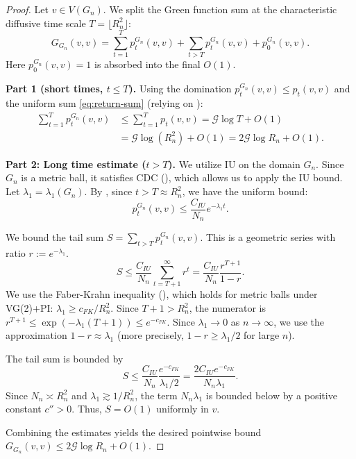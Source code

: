 \documentclass{article}
\numberwithin{equation}{section}
\theoremstyle{definition}
\theoremstyle{remark}
\newcommand{\cG}{\mathcal{G}}
\begin{document}
\begin{proof}
Let $v \in V(G_n)$. We split the Green function sum at the characteristic diffusive time scale $T = \lfloor R_n^2 \rfloor$:
\[
G_{G_n}(v,v) = \sum_{t=1}^{T} p_t^{G_n}(v,v) + \sum_{t > T} p_t^{G_n}(v,v) + p_0^{G_n}(v,v).
\]
Here $p_0^{G_n}(v,v)=1$ is absorbed into the final $O(1)$.

\textbf{Part 1 (short times, $t\le T$).} Using the domination $p_t^{G_n}(v,v)\le p_t(v,v)$ and the uniform sum \eqref{eq:return-sum} (relying on ):
\begin{align*}
\sum_{t=1}^{T} p_t^{G_n}(v,v) &\leq \sum_{t=1}^{T} p_t(v,v) = \cG \log T + O(1) \\
&= \cG \log(R_n^2) + O(1) = 2\cG \log R_n + O(1).
\end{align*}

\textbf{Part 2: Long time estimate ($t > T$).}
We utilize IU on the domain $G_n$. Since $G_n$ is a metric ball, it satisfies CDC (), which allows us to apply the IU bound. Let $\lambda_1 = \lambda_1(G_n)$. By , since $t > T \approx R_n^2$, we have the uniform bound:
\begin{equation}
p_t^{G_n}(v,v) \leq \frac{C_{IU}}{N_n} e^{-\lambda_1 t}.
\end{equation}

We bound the tail sum $S = \sum_{t > T} p_t^{G_n}(v,v)$. This is a geometric series with ratio $r:=e^{-\lambda_1}$.
\[
S \leq \frac{C_{IU}}{N_n} \sum_{t=T+1}^\infty r^t = \frac{C_{IU}}{N_n} \frac{r^{T+1}}{1-r}.
\]
We use the Faber-Krahn inequality (), which holds for metric balls under VG(2)+PI: $\lambda_1 \geq c_{FK}/R_n^2$. Since $T+1 > R_n^2$, the numerator is $r^{T+1} \leq \exp(-\lambda_1(T+1)) \leq e^{-c_{FK}}$. Since $\lambda_1 \to 0$ as $n \to \infty$, we use the approximation $1-r \approx \lambda_1$ (more precisely, $1-r \geq \lambda_1/2$ for large $n$).

The tail sum is bounded by
\[
S \leq \frac{C_{IU}}{N_n} \frac{e^{-c_{FK}}}{\lambda_1/2} = \frac{2 C_{IU} e^{-c_{FK}}}{N_n \lambda_1}.
\]
Since $N_n \asymp R_n^2$ and $\lambda_1 \gtrsim 1/R_n^2$, the term $N_n \lambda_1$ is bounded below by a positive constant $c''>0$. Thus, $S = O(1)$ uniformly in $v$.

Combining the estimates yields the desired pointwise bound $G_{G_n}(v,v) \leq 2\cG \log R_n + O(1)$.
\end{proof}
\end{document}
